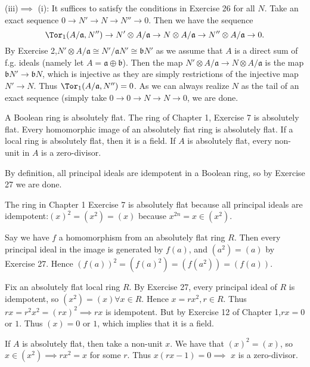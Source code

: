 \begin{questions}
\begin{solution}
		(iii)$\implies$ (i):
		It suffices to satisfy the conditions in Exercise 26 for all $N$.
		Take an exact sequence $0\to N' \to N \to N'' \to 0$.
		Then we have the sequence
		\[
			\Tor_1(A / \mathfrak{a},N'') \to N' \otimes A / \mathfrak{a} \to N \otimes A / \mathfrak{a} \to N'' \otimes A / \mathfrak{a}\to 0
		.\]
		By Exercise 2,$N' \otimes A / \mathfrak{a} \cong N' / \mathfrak{a}N' \cong \mathfrak{b}N'$ as we assume that $A$ is a direct sum of f.g. ideals (namely let $A = \mathfrak{a}\oplus \mathfrak{b} $).
		Then the map $N' \otimes A / \mathfrak{a} \to N \otimes A / \mathfrak{a}$ is the map $\mathfrak{b}N' \to \mathfrak{b}N $, which is injective as they are simply restrictions of the injective map $N' \to N$.
		Thus $\Tor_1(A / \mathfrak{a}, N'') = 0$.
		As we can always realize $N$ as the tail of an exact sequence (simply take $0\to 0 \to N \to N \to 0$, we are done.
	\end{solution}

	\question A Boolean ring is absolutely flat. The ring of Chapter 1, Exercise 7 is absolutely flat. Every homomorphic image of an absolutely fiat ring is absolutely flat. If a local ring is absolutely flat, then it is a field. If $A$ is absolutely flat, every non-unit in $A$ is a zero-divisor.
	\begin{solution}
		By definition, all principal ideals are idempotent in a Boolean ring, so by Exercise 27 we are done.

		The ring in Chapter 1 Exercise 7 is absolutely flat because all principal ideals are idempotent:$(x)^2= (x^2) = (x)$ because $x^{2n} = x \in (x^2)$.

		Say we have $f$ a homomorphism from an absolutely flat ring $R$.
		Then every principal ideal in the image is generated by $f(a) $, and $(a^2) = (a)$ by Exercise 27.
		Hence $(f(a))^2 = (f(a)^2) = (f(a^2)) = (f(a))$.

		Fix an absolutely flat local ring $R$.
		By Exercise 27, every principal ideal of $R$ is idempotent, so $(x^2) = (x) \forall x \in R$.
		Hence $x = rx^2, r \in R$.
		Thus $rx = r^2x^2 = (rx)^2 \implies rx$ is idempotent.
		But by Exercise 12 of Chapter 1,$rx = 0$ or $1$.
		Thus $(x) = 0$ or $1 $, which implies that it is a field.

		If $A$ is absolutely flat, then take a non-unit $x$.
		We have that $(x)^2 = (x) $, so $x \in (x^2) \implies rx^2 = x$ for some $r$.
		Thus $x(rx-1) = 0 \implies$ $x$ is a zero-divisor.
	\end{solution}
\end{questions}
